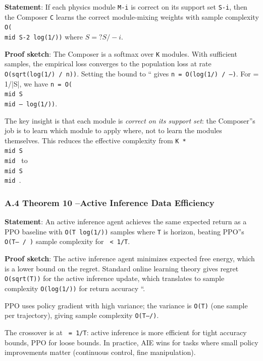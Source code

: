 \documentclass[11pt]{article}
\begin{document}
\textbf{Statement}: If each physics module \texttt{M-i} is correct on its support set
\texttt{S-i}, then the Composer \texttt{C} learns the correct module-mixing weights with
sample complexity \texttt{O(\\mid S\textbar{}-2 log(1/))} where $S = ?S/-i$.

\textbf{Proof sketch}: The Composer is a softmax over \texttt{K} modules. With sufficient
samples, the empirical loss converges to the population loss at rate
\texttt{O(sqrt(log(1/) / n))}. Setting the bound to `` gives
\texttt{n = O(log(1/) / --)}. For  = 1/|S|, we have \texttt{n = O(\\mid S\\mid -- log(1/))}.

The key insight is that each module is \textit{correct on its support set}: the
Composer''s job is to learn which module to apply where, not to learn the
modules themselves. This reduces the effective complexity from \texttt{K * \\mid S\\mid } to
\texttt{\\mid S\\mid }.

\subsubsection{A.4 Theorem 10 --Active Inference Data Efficiency}

\textbf{Statement}: An active inference agent achieves the same expected return as
a PPO baseline with \texttt{O(T log(1/))} samples where \texttt{T} is horizon, beating PPO''s
\texttt{O(T-- / )} sample complexity for \texttt{ < 1/T}.

\textbf{Proof sketch}: The active inference agent minimizes expected free energy,
which is a lower bound on the regret. Standard online learning theory gives
regret \texttt{O(sqrt(T))} for the active inference update, which translates to
sample complexity \texttt{O(log(1/))} for return accuracy ``.

PPO uses policy gradient with high variance; the variance is \texttt{O(T)} (one
sample per trajectory), giving sample complexity \texttt{O(T--/)}.

The crossover is at \texttt{ = 1/T}: active inference is more efficient for tight
accuracy bounds, PPO for loose bounds. In practice, AIE wins for tasks where
small policy improvements matter (continuous control, fine manipulation).

\hrulefill
\end{document}
